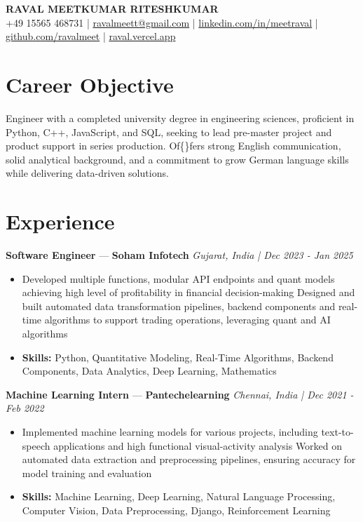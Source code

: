 \documentclass[a4paper,10pt]{article}
\begin{document}
\begin{center}
  {\Large\bfseries RAVAL MEETKUMAR RITESHKUMAR}\\[2pt]
  {\small +49 15565 468731 \;|\; \href{mailto:ravalmeett@gmail.com}{ravalmeett@gmail.com} \;|\; \href{https://www.linkedin.com/in/meetraval/}{linkedin.com/in/meetraval} \;|\; \href{https://github.com/ravalmeet}{github.com/ravalmeet} \;|\; \href{https://raval.vercel.app/}{raval.vercel.app}}
\end{center}
\vspace{-3pt}

\section*{Career Objective}
Engineer with a completed university degree in engineering sciences, proficient in Python, C++, JavaScript, and SQL, seeking to lead pre-master project and product support in series production. Of\{\}fers strong English communication, solid analytical background, and a commitment to grow German language skills while delivering data-driven solutions.\par

\section*{Experience}
\textbf{Software Engineer} — \textbf{Soham Infotech} \hfill \textit{Gujarat, India \;|\; Dec 2023 - Jan 2025}\par
\vspace{1pt}
\begin{itemize}
  \item Developed multiple functions, modular API endpoints and quant models achieving high level of profitability in financial decision-making Designed and built automated data transformation pipelines, backend components and real-time algorithms to support trading operations, leveraging quant and AI algorithms
  \item \textbf{Skills:} Python, Quantitative Modeling, Real-Time Algorithms, Backend Components, Data Analytics, Deep Learning, Mathematics
\end{itemize}
\vspace{3pt}
\textbf{Machine Learning Intern} — \textbf{Pantechelearning} \hfill \textit{Chennai, India \;|\; Dec 2021 - Feb 2022}\par
\vspace{1pt}
\begin{itemize}
  \item Implemented machine learning models for various projects, including text-to-speech applications and high functional visual-activity analysis Worked on automated data extraction and preprocessing pipelines, ensuring accuracy for model training and evaluation
  \item \textbf{Skills:} Machine Learning, Deep Learning, Natural Language Processing, Computer Vision, Data Preprocessing, Django, Reinforcement Learning
\end{itemize}
\end{document}
